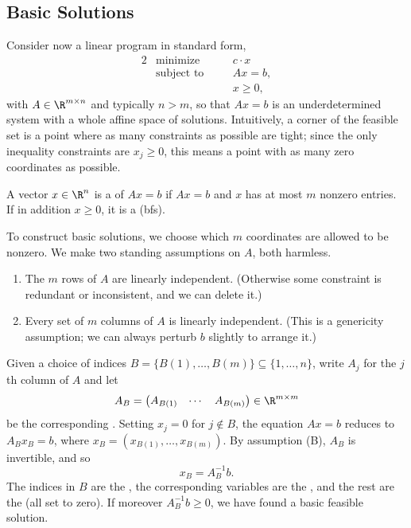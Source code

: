 \subsection{Basic Solutions}

Consider now a linear program in standard form,
\begin{alignat*}{2}
    & \text{minimize} \quad && c \cdot x \\
    & \text{subject to} \quad && Ax = b, \\
    & && x \geq 0,
\end{alignat*}
with $A \in \R^{m \times n}$ and typically $n > m$, so that $Ax = b$ is an underdetermined system with a whole affine space of solutions. Intuitively, a corner of the feasible set is a point where as many constraints as possible are tight; since the only inequality constraints are $x_j \geq 0$, this means a point with as many zero coordinates as possible.

\begin{definition}
    A vector $x \in \R^n$ is a  of $Ax = b$ if $Ax = b$ and $x$ has at most $m$ nonzero entries. If in addition $x \geq 0$, it is a  (bfs).
\end{definition}

To construct basic solutions, we choose which $m$ coordinates are allowed to be nonzero. We make two standing assumptions on $A$, both harmless.
\begin{enumerate}[label=(\Alph*)]
    \item The $m$ rows of $A$ are linearly independent. (Otherwise some constraint is redundant or inconsistent, and we can delete it.)
    \item Every set of $m$ columns of $A$ is linearly independent. (This is a genericity assumption; we can always perturb $b$ slightly to arrange it.)
\end{enumerate}

Given a choice of indices $B = \{B(1), \dots, B(m)\} \subseteq \{1, \dots, n\}$, write $A_j$ for the $j$th column of $A$ and let
$$
A_B = \begin{pmatrix} A_{B(1)} & \cdots & A_{B(m)}\end{pmatrix} \in \R^{m\times m}
$$
be the corresponding . Setting $x_j = 0$ for $j \notin B$, the equation $Ax = b$ reduces to $A_B x_B = b$, where $x_B = (x_{B(1)}, \dots, x_{B(m)})$. By assumption (B), $A_B$ is invertible, and so
$$
x_B = A_B^{-1}b.
$$
The indices in $B$ are the , the corresponding variables are the , and the rest are the  (all set to zero). If moreover $A_B^{-1}b \geq 0$, we have found a basic feasible solution.

